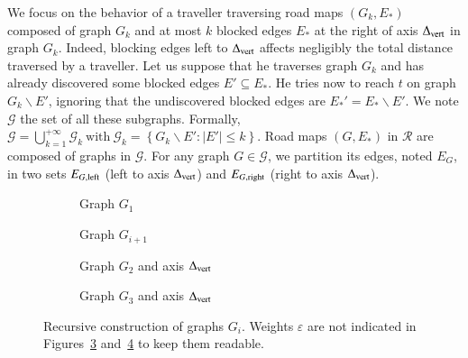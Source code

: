 \documentclass[preprint]{elsarticle}
\newcommand{\set}[1]{\left\{ #1 \right\}}
\newcommand{\card}[1]{\left| #1 \right|}
\newcommand{\mcalg}{\mathcal{G}}
\newcommand{\mcalr}{\mathcal{R}}
\newcommand{\deltavert}{\Delta_{\mbox{\scriptsize{vert}}}}
\newcommand{\eleft}[1]{E_{#1, \mbox{\scriptsize{left}}}}
\newcommand{\eright}[1]{E_{#1, \mbox{\scriptsize{right}}}}
\begin{document}

We focus on the behavior of a traveller traversing road maps $\left(G_k,E_*\right)$ composed of graph $G_k$ and at most $k$ blocked edges $E_*$ at the right of axis $\deltavert$ in graph $G_k$. Indeed, blocking edges left to $\deltavert$ affects negligibly the total distance traversed by a traveller. Let us suppose that he traverses graph $G_k$ and has already discovered some blocked edges $E' \subseteq E_*$. He tries now to reach $t$ on graph $G_k\backslash E'$, ignoring that the undiscovered blocked edges are $E_*' = E_* \backslash E'$.
We note $\mcalg$ the set of all these subgraphs. Formally, $\mcalg = \bigcup_{k=1}^{+\infty} \mcalg_k ~\mbox{with}~
\mcalg_k = \set{G_k\backslash E' : \card{E'} \leq k}$. Road maps $\left(G,E_*\right)$ in $\mcalr$ are composed of graphs in $\mcalg$. For any graph $G \in \mcalg$, we partition its edges, noted $E_G$, in two sets $\eleft{G}$ (left to axis $\deltavert$) and $\eright{G}$ (right to axis $\deltavert$).

\begin{figure}[h]
\centering
\begin{subfigure}[b]{0.49\columnwidth}
\centering
\scalebox{.52}{}
\caption{Graph $G_1$}
\label{subfig:G_1}
\end{subfigure}
\begin{subfigure}[b]{0.49\columnwidth}
\centering
\scalebox{.52}{}
\caption{Graph $G_{i+1}$}
\label{subfig:G_i}
\end{subfigure}
\begin{subfigure}[b]{0.49\columnwidth}
\centering
\scalebox{.45}{}
\caption{Graph $G_2$ and axis $\deltavert$}
\label{subfig:G_2}
\end{subfigure}
\begin{subfigure}[b]{0.49\columnwidth}
\centering
\scalebox{0.45}{}
\caption{Graph $G_3$ and axis $\deltavert$}
\label{subfig:G_3}
\end{subfigure}
\caption{Recursive construction of graphs $G_i$. Weights $\varepsilon$ are not indicated in Figures~\ref{subfig:G_2} and~\ref{subfig:G_3} to keep them readable.}
\label{fig:G_i}
\end{figure}
\end{document}
